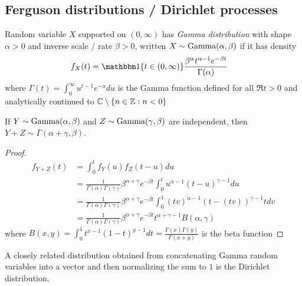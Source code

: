 
\subsection{Ferguson distributions / Dirichlet processes}

\begin{definition}
  Random variable $X$ supported on $(0,\infty)$ has \emph{Gamma distribution}
  with shape $\alpha > 0$ and inverse scale / rate $\beta > 0$, written $X \sim
  \mathrm{Gamma}(\alpha, \beta)$ if it has density
  \begin{align}
    f_X(t) &= \ind\{t \in (0,\infty)\} \frac{\beta^{\alpha} t^{\alpha - 1} e^{-\beta t}}{\Gamma(\alpha)}
  \end{align}
  where $\Gamma(t) = \int_0^\infty u^{t-1} e^{-u} du$ is the Gamma function
  defined for all $\Re t > 0$ and analytically continued to $\mathbb{C} \setminus \{ n \in \mathbb{Z} : n < 0 \}$
  \end{definition}

  \begin{proposition}
    \label{prop:gamma-closed-sum}
    If $Y \sim \mathrm{Gamma}(\alpha, \beta)$
    and $Z \sim \mathrm{Gamma}(\gamma, \beta)$ are independent,
    then $Y+Z \sim \Gamma(\alpha + \gamma, \beta)$.
  \end{proposition}

  \begin{proof}
    \begin{align*}
      f_{Y+Z}(t)
      &= \int_0^t f_Y(u) f_Z(t-u) du \\
      &= \frac{1}{\Gamma(\alpha) \Gamma(\gamma)} \beta^{\alpha + \gamma} e^{-\beta t}
      \int_0^t u^{\alpha - 1} (t-u)^{\gamma - 1} du \\
      &= \frac{1}{\Gamma(\alpha) \Gamma(\gamma)} \beta^{\alpha + \gamma} e^{-\beta t}
      \int_0^1 (t v)^{\alpha - 1} (t-(t v))^{\gamma - 1} t dv \\
      &= \frac{1}{\Gamma(\alpha) \Gamma(\gamma)} \beta^{\alpha + \gamma} e^{-\beta t}
      t^{\alpha + \gamma - 1} B(\alpha, \gamma)
    \end{align*}
    where
    $B(x,y) = \int_0^1 t^{x-1} (1 - t)^{y-1} dt = \frac{\Gamma(x) \Gamma(y)}{\Gamma(x+y)}$
    is the beta function
  \end{proof}

  A closely related distribution obtained from concatenating Gamma random
  variables into a vector and then normalizing the sum to $1$ is the Dirichlet
  distribution.

